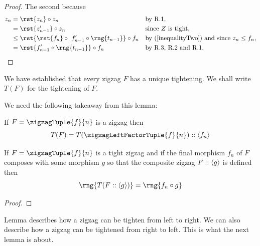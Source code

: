 {\begin{proof}
The second  because
\begin{align*}
 z_n &= \rst{z_n} \circ z_n
         &&\mbox{by R.1,}\\        
     &=  \rst{z'_{n-1}} \circ z_n 
         &&\mbox{since $Z$ is tight,}\\
     &\leq  \rst{\rst{f_n} \circ\ f'_{n-1} \circ \rng{t_{n-1}}} \circ f_n
         &&\mbox{by (\ref{inequalityTwo}) and since $z_n \leq f_n$,} \\
         &= \rst{f'_{n-1} \circ \rng{t_{n-1}}} \circ f_n
         && \mbox{by R.3, R.2 and R.1.}
\end{align*}
\end{proof}
} %
We have established that every zigzag $F$ has a unique tightening. 
We shall write $T(F)$ for the tightening of $F$. 


\begin{worktt}
We  need the following takeaway from this lemma:
\begin{observation}

If $F=\zigzagTuple{f}{n}$ is a zigzag then
\[
T(F) = T(\zigzagLeftFactorTuple{f}{n}) ::\tuple{f_n}
\] 
\end{observation}
\end{worktt}


\begin{worktt}
\begin{lemma}
If  $F=\zigzagTuple{f}{n}$ is a tight zigzag 
and if the final morphism $f_n$ of $F$ composes with some morphism $g$
 so that the composite zigzag $F :: \langle g\rangle$ is defined then
\[
\rng{T(F :: \tuple{g})}=\rng{f_n \circ g}
\]
\end{lemma}
\begin{proof}

\end{proof}
\end{worktt}

Lemma  describes how a zigzag can be tighten from left to right. We can also describe how a zigzag can be
tightened from right to left. This is what the next lemma is about.
\iffalse
\newcommand{\tightTail}
  {\rst{f'_1 \circ \rng{f_1}} \circ f_2,\;
  f'_2,...f_{n-2},f'_{n-1}, f_n
  }      

